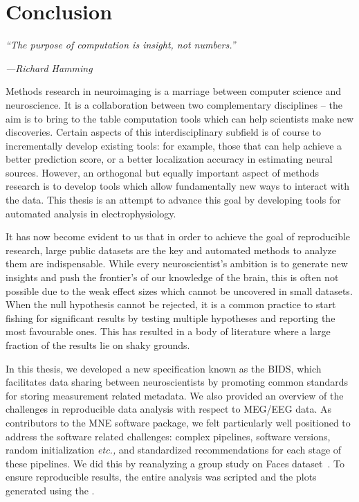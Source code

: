 \chapter{Conclusion}
\label{chapter:conclusion}

\epigraph{\small\itshape ``The purpose of computation is insight, not  numbers.''}{\small\textit{---Richard Hamming}}

Methods research in neuroimaging is a marriage between computer science and neuroscience. It is a collaboration between two complementary disciplines -- the aim is to bring to the table computation tools which can help scientists make new discoveries. Certain aspects of this interdisciplinary subfield is of course to incrementally develop existing tools: for example, those that can help achieve a better prediction score, or a better localization accuracy in estimating neural sources. However, an orthogonal but equally important aspect of methods research is to develop tools which allow fundamentally new ways to interact with the data. This thesis is an attempt to advance this goal by developing tools for automated analysis in electrophysiology.

It has now become evident to us that in order to achieve the goal of reproducible research, large public datasets are the key and automated methods to analyze them are indispensable. While every neuroscientist's ambition is to generate new insights and push the frontier's of our knowledge of the brain, this is often not possible due to the weak effect sizes which cannot be uncovered in small datasets. When the null hypothesis cannot be rejected, it is a common practice to start fishing for significant results by testing multiple hypotheses and reporting the most favourable ones. This has resulted in a body of literature where a large fraction of the results lie on shaky grounds. 

In this thesis, we developed a new specification known as the \ac{BIDS}, which facilitates data sharing between neuroscientists by promoting common standards for storing measurement related metadata. We also provided an overview of the challenges in reproducible data analysis with respect to \ac{MEG}/\ac{EEG} data. As contributors to the MNE software package, we felt particularly well positioned to address  the software related challenges: complex pipelines, software versions, random initialization \emph{etc.,} and standardized recommendations for each stage of these pipelines. We did this by reanalyzing a group study on Faces dataset~\citep{wakeman2015multi}. To ensure reproducible results, the entire analysis was scripted and the plots generated using the .

